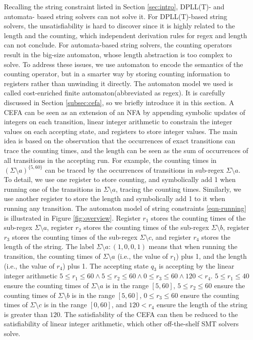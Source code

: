 Recalling the string constraint listed in Section \ref{sec:intro}, DPLL(T)- and automata- based string solvers can not solve it. For DPLL(T)-based string solvers, the unsatisfiability is hard to discover since it is highly related to the length and the counting, which independent derivation rules for regex and length can not conclude. For automata-based string solvers, the counting operators result in the big-size automaton, whose length abstraction is too complex to solve. To address these issues, we use automaton to encode the semantics of the counting operator, but in a smarter way by storing counting information to registers rather than unwinding it directly. The automaton model we used is called cost-enriched finite automaton(abbreviated as regex). It is carefully discussed in Section \ref{subsec:cefa}, so we briefly introduce it in this section. A CEFA can be seen as an extension of an NFA by appending symbolic updates of integers on each transition, linear integer arithmetic to constrain the integer values on each accepting state, and registers to store integer values. The main idea is based on the observation that the occurrences of exact transitions can trace the counting times, and the length can be seen as the sum of occurrences of all transitions in the accepting run. For example, the counting times in $(\Sigma \setminus a)^{\{5, 60\}}$ can be traced by the occurrences of transitions in sub-regex $\Sigma \setminus a$. To detail, we use one register to store counting, and symbolically add 1 when running one of the transitions in $\Sigma \setminus a$, tracing the counting times. Similarly, we use another register to store the length and symbolically add 1 to it when running any transition. The automaton model of string constraints \ref{eqn-running} is illustrated in Figure \ref{fig:overview}. Register $r_1$ stores the counting times of the sub-regex $\Sigma \setminus a$, register $r_2$ stores the counting times of the sub-regex $\Sigma \setminus b$, register $r_3$ stores the counting times of the sub-regex $\Sigma \setminus c$, and register $r_4$ stores the length of the string. The label $\Sigma \setminus a:(1,0,0,1)$ means that when running the transition, the counting times of $\Sigma \setminus a$ (i.e., the value of $r_1$) plus 1, and the length (i.e., the value of $r_4$) plus 1. The accepting state $q_3$ is accepting by the linear integer arithmetic $5\leq r_1\leq 60\wedge 5\leq r_2\leq 60\wedge 0\leq r_3\leq 60\wedge 120 < r_4$. $5\leq r_1\leq 40$ ensure the counting times of $\Sigma \setminus a$ is in the range $[5, 60]$, $5\leq r_2\leq 60$ ensure the counting times of $\Sigma \setminus b$ is in the range $[5, 60]$, $0\leq r_3\leq 60$ ensure the counting times of $\Sigma \setminus c$ is in the range $[0, 60]$, and $120 < r_4$ ensure the length of the string is greater than $120$. The satisfiability of the CEFA can then be reduced to the satisfiability of linear integer arithmetic, which other off-the-shelf SMT solvers solve. \newline
